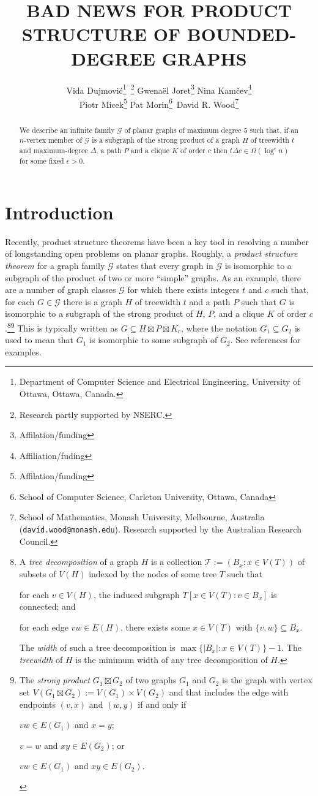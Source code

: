 \documentclass{patmorin}
\title{\MakeUppercase{Bad News for Product Structure of Bounded-Degree Graphs}}
\author{%
  Vida Dujmović\thanks{Department of Computer Science and Electrical Engineering, University of Ottawa, Ottawa, Canada.}\, \thanks{Research partly supported by NSERC.} \quad
  Gwenaël Joret\thanks{Affilation/funding} \quad
  Nina Kam\v{c}ev\thanks{Affiliation/fuding} \\[1ex]
  Piotr Micek\thanks{Affilation/funding}\quad
  Pat Morin\thanks{School of Computer Science, Carleton University, Ottawa, Canada}\, \footnotemark[2] \quad
  David R. Wood\thanks{School of Mathematics, Monash University, Melbourne, Australia (\texttt{david.wood@monash.edu}). Research supported by the Australian Research Council.}
}
\date{}
\newcommand{\defin}[1]{\emph{\color{brightmaroon}#1}}
\begin{document}
\maketitle
\renewcommand{\E}{\mathbb{E}}
\renewcommand{\Pr}{\mathbb{P}}


\begin{abstract}
  We describe an infinite family $\mathcal{G}$ of planar graphs of maximum degree $5$ such that, if an $n$-vertex member of $\mathcal{G}$ is a subgraph of the strong product of a graph $H$ of treewidth $t$ and maximum-degree $\Delta$, a path $P$ and a clique $K$ of order $c$ then $t\Delta c \in \Omega(\log^\epsilon n)$ for some fixed $\epsilon >0$.
\end{abstract}

\section{Introduction}

Recently, product structure theorems have been a key tool in resolving a number of longstanding open problems on planar graphs.  Roughly, a \defin{product structure theorem} for a graph family $\mathcal{G}$ states that every graph in $\mathcal{G}$ is isomorphic to a subgraph of the product of two or more ``simple'' graphs.  As an example, there are a number of graph classes $\mathcal{G}$ for which there exists integers $t$ and $c$ such that, for each $G\in\mathcal{G}$ there is a graph $H$ of treewidth $t$ and a path $P$ such that $G$ is isomorphic to a subgraph of the strong product of $H$, $P$, and a clique $K$ of order $c$.\footnote{A \defin{tree decomposition} of a graph $H$ is a collection $\mathcal{T}:=(B_x:x\in V(T))$ of subsets of $V(H)$ indexed by the nodes of some tree $T$ such that
\begin{inparaenum}[(i)]
  \item for each $v\in V(H)$, the induced subgraph $T[x\in V(T):v\in B_x]$ is connected; and
  \item for each edge $vw\in E(H)$, there exists some $x\in V(T)$ with $\{v,w\}\subseteq B_x$.
\end{inparaenum}
The \defin{width} of such a tree decomposition is $\max\{|B_x|:x\in V(T)\}-1$. The \defin{treewidth} of $H$ is the minimum width of any tree decomposition of $H$.}\footnote{The \defin{strong product} $G_1\boxtimes G_2$ of two graphs $G_1$ and $G_2$ is the graph with vertex set $V(G_1\boxtimes G_2):=V(G_1)\times V(G_2)$ and that includes the edge with endpoints $(v,x)$ and $(w,y)$ if and only if
\begin{inparaenum}[(i)]
  \item $vw\in E(G_1)$ and $x=y$;
  \item $v=w$ and $xy\in E(G_2)$; or
  \item $vw\in E(G_1)$ and $xy\in E(G_2)$.
\end{inparaenum}
}
This is typically written as $G\subseteq H\boxtimes P\boxtimes K_c$, where the notation $G_1\subseteq G_2$ is used to mean that $G_1$ is isomorphic to some subgraph of $G_2$.  See references \cite{dujmovic.joret.ea:planar,dujmovic.morin.ea:structure,krauthgamer.lee:intrinsic,ueckerdt.wood.ea:improved,bose.morin.ea:optimal,campbell.clinch.ea:product,illingworth.scott.ea:alon} for examples.
\end{document}
